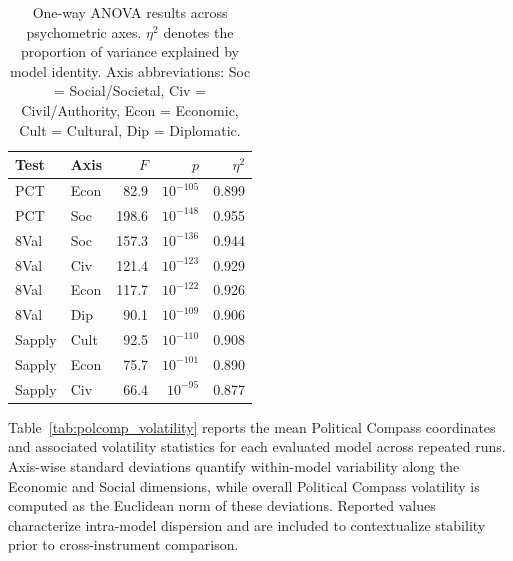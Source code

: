 \documentclass[11pt]{article}
\begin{document}
\begin{table}[t]
\centering
\footnotesize
\setlength{\tabcolsep}{3.5pt}
\begin{tabular}{l l r r r}
\toprule
\textbf{Test} & \textbf{Axis} & \textbf{$F$} & \textbf{$p$} & \textbf{$\eta^2$} \\
\midrule
PCT & Econ & 82.9 & $10^{-105}$ & 0.899 \\
PCT & Soc & 198.6 & $10^{-148}$ & 0.955 \\
8Val & Soc & 157.3 & $10^{-136}$ & 0.944 \\
8Val & Civ & 121.4 & $10^{-123}$ & 0.929 \\
8Val & Econ & 117.7 & $10^{-122}$ & 0.926 \\
8Val & Dip & 90.1 & $10^{-109}$ & 0.906 \\
Sapply & Cult & 92.5 & $10^{-110}$ & 0.908 \\
Sapply & Econ & 75.7 & $10^{-101}$ & 0.890 \\
Sapply & Civ & 66.4 & $10^{-95}$ & 0.877 \\
\bottomrule
\end{tabular}
\caption{One-way ANOVA results across psychometric axes. $\eta^2$ denotes the proportion of variance explained by model identity. Axis abbreviations: Soc = Social/Societal, Civ = Civil/Authority, Econ = Economic, Cult = Cultural, Dip = Diplomatic.}
\label{tab:anova_effect_sizes}
\end{table}


Table~\ref{tab:polcomp_volatility} reports the mean Political Compass coordinates and associated volatility statistics for each evaluated model across repeated runs. Axis-wise standard deviations quantify within-model variability along the Economic and Social dimensions, while overall Political Compass volatility is computed as the Euclidean norm of these deviations. Reported values characterize intra-model dispersion and are included to contextualize stability prior to cross-instrument comparison.
\end{document}
